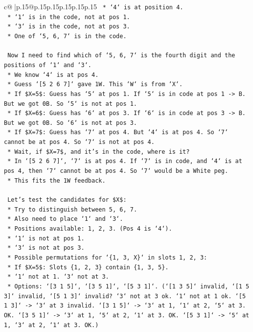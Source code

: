\documentclass{article}
\begin{document}
{\begin{supertabular}{c@{$\;$}|p{.15\linewidth}@{}p{.15\linewidth}p{.15\linewidth}p{.15\linewidth}p{.15\linewidth}p{.15\linewidth}}
{{{\texttt{    *   `4` is at position 4.} \\
\texttt{    *   `1` is in the code, not at pos 1.} \\
\texttt{    *   `3` is in the code, not at pos 3.} \\
\texttt{    *   One of `5, 6, 7` is in the code.} \\
\\ 
\texttt{    Now I need to find which of `5, 6, 7` is the fourth digit and the positions of `1` and `3`.} \\
\texttt{    *   We know `4` is at pos 4.} \\
\texttt{    *   Guess `{[}5 2 6 7{]}` gave 1W. This `W` is from `X`.} \\
\texttt{    *   If \$X=5\$: Guess has `5` at pos 1. If `5` is in code at pos 1 {-}> B. But we got 0B. So `5` is not at pos 1.} \\
\texttt{    *   If \$X=6\$: Guess has `6` at pos 3. If `6` is in code at pos 3 {-}> B. But we got 0B. So `6` is not at pos 3.} \\
\texttt{    *   If \$X=7\$: Guess has `7` at pos 4. But `4` is at pos 4. So `7` cannot be at pos 4. So `7` is not at pos 4.} \\
\texttt{    *   Wait, if \$X=7\$, and it's in the code, where is it?} \\
\texttt{        *   In `{[}5 2 6 7{]}`, `7` is at pos 4. If `7` is in code, and `4` is at pos 4, then `7` cannot be at pos 4. So `7` would be a White peg.} \\
\texttt{        *   This fits the 1W feedback.} \\
\\ 
\texttt{    Let's test the candidates for \$X\$:} \\
\texttt{    *   Try to distinguish between 5, 6, 7.} \\
\texttt{    *   Also need to place `1` and `3`.} \\
\texttt{    *   Positions available: 1, 2, 3. (Pos 4 is `4`).} \\
\texttt{    *   `1` is not at pos 1.} \\
\texttt{    *   `3` is not at pos 3.} \\
\texttt{    *   Possible permutations for `\{1, 3, X\}` in slots 1, 2, 3:} \\
\texttt{        *   If \$X=5\$: Slots \{1, 2, 3\} contain \{1, 3, 5\}.} \\
\texttt{            *   `1` not at 1. `3` not at 3.} \\
\texttt{            *   Options: `{[}3 1 5{]}`, `{[}3 5 1{]}`, `{[}5 3 1{]}`. (`{[}1 3 5{]}` invalid, `{[}1 5 3{]}` invalid, `{[}5 1 3{]}` invalid? `3` not at 3 ok. `1` not at 1 ok. `{[}5 1 3{]}` {-}> `3` at 3 invalid. `{[}3 1 5{]}` {-}> `3` at 1, `1` at 2, `5` at 3. OK. `{[}3 5 1{]}` {-}> `3` at 1, `5` at 2, `1` at 3. OK. `{[}5 3 1{]}` {-}> `5` at 1, `3` at 2, `1` at 3. OK.)} \\
}}}
\end{supertabular}}
\end{document}
